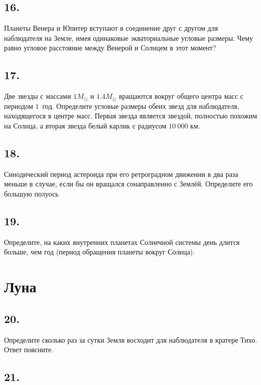 \documentclass[a4paper,12pt]{article}
\begin{document}
\subsection*{16.}

Планеты Венера и Юпитер вступают в соединение друг с другом для наблюдателя на Земле, имея одинаковые экваториальные угловые размеры. Чему равно угловое расстояние между Венерой и Солнцем в этот момент? %

\subsection*{17.}

Две звезды с массами $1M_{\odot}$ и $1.4M_{\odot}$ вращаются вокруг общего центра масс с периодом $1$~год. Определите угловые размеры обеих звезд для наблюдателя, находящегося в центре масс.
Первая звезда является звездой, полностью похожим на Солнца, а вторая звезда белый карлик с радиусом $10~000$ км.

\subsection*{18.}

Синодический период астероида при его ретроградном движении в два
раза меньше в случае, если бы он вращался сонаправленно с Землёй. Определите
его большую полуось  %

\subsection*{19. }

Определите, на каких внутренних планетах Солнечной системы день длится больше,
чем год (период обращения планеты вокруг Солнца). %

\section*{Луна}

\subsection*{20.}

Определите сколько раз за сутки Земля восходит для наблюдателя в кратере Тихо. Ответ поясните.

\subsection*{21.}
\end{document}
